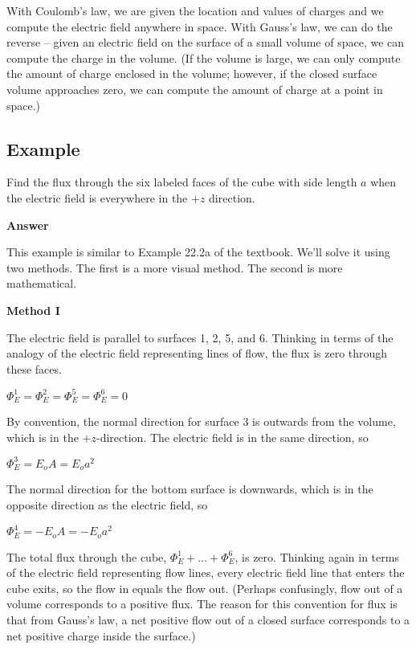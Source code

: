 \documentclass{article}
\begin{document}
With Coulomb's law, we are given the location and values of charges and we compute the electric field anywhere in space. With Gauss's law, we can do the reverse -- given an electric field on the surface of a small volume of space, we can compute the charge in the volume. (If the volume is large, we can only compute the amount of charge enclosed in the volume; however, if the closed surface volume approaches zero, we can compute the amount of charge at a point in space.)

\newpage

\subsection{Example}



Find the flux through the six labeled faces of the cube with side length $a$ when the electric field is everywhere in the $+z$ direction.

\textbf{Answer}

This example is similar to Example 22.2a of the textbook. We'll solve it using two methods. The first is a more visual method. The second is more mathematical.

\textbf{Method I}

The electric field is parallel to surfaces 1, 2, 5, and 6. Thinking in terms of the analogy of the electric field representing lines of flow, the flux is zero through these faces.

$\Phi_E^{1}=\Phi_E^{2}=\Phi_E^{5}=\Phi_E^{6}=0$

By convention, the normal direction for surface 3 is outwards from the volume, which is in the $+z$-direction. The electric field is in the same direction, so

$\Phi_E^{3}=E_oA=E_oa^2$

The normal direction for the bottom surface is downwards, which is in the opposite direction as the electric field, so

$\Phi_E^{4}=-E_oA=-E_oa^2$

The total flux through the cube, $\Phi_E^1+…+\Phi_E^6$, is zero. Thinking again in terms of the electric field representing flow lines, every electric field line that enters the cube exits, so the flow in equals the flow out. (Perhaps confusingly, flow out of a volume corresponds to a positive flux. The reason for this convention for flux is that from Gauss's law, a net positive flow out of a closed surface corresponds to a net positive charge inside the surface.)
\end{document}
